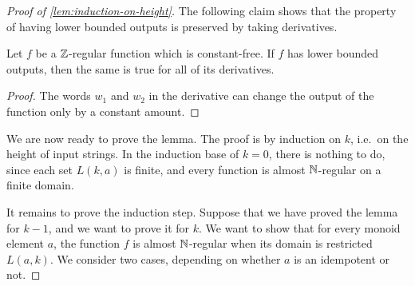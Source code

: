 \begin{proof}[Proof of \cref{lem:induction-on-height}]
The following claim shows that the property of having lower bounded outputs is preserved by taking derivatives.

\begin{claim}\label{claim:derivative-lower-bounded}
    Let $f$ be a ${\mathbb Z}$-regular function which is constant-free. If $f$ has lower bounded outputs, then the same is true for all of its derivatives.
\end{claim}
\begin{proof}
    The words $w_1$ and $w_2$ in the derivative can change the output of the function only by a constant amount.
\end{proof}




We are now ready to prove the lemma. The proof is by induction on $k$, i.e.~on the height of input strings. In the induction base of $k=0$, there is nothing to do, since each set $L(k,a)$ is finite, and every function is almost ${\mathbb N}$-regular on a finite domain. 

It remains to prove the induction step. 
Suppose that we have proved the lemma for  $k-1$, and we want to prove it for $k$.  We want to show that for every monoid element $a$, the function $f$ is almost ${\mathbb N}$-regular when its domain is restricted $L(a,k)$. We consider two cases, depending on whether $a$ is an idempotent or not.



\end{proof}
